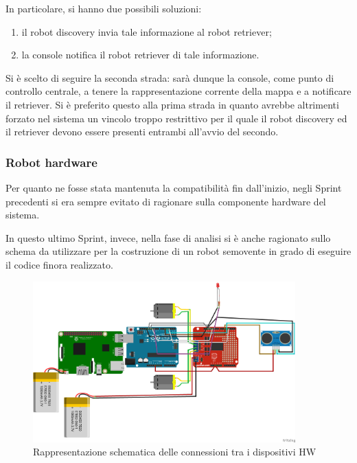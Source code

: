 In particolare, si hanno due possibili soluzioni:

\begin{enumerate}
  \item il robot discovery invia tale informazione al robot retriever;
  \item la console notifica il robot retriever di tale informazione.
\end{enumerate}

Si è scelto di seguire la seconda strada: sarà dunque la console, come punto di controllo centrale, a tenere la rappresentazione corrente della mappa e a notificare il retriever.
Si è preferito questo alla prima strada in quanto avrebbe altrimenti forzato nel sistema un vincolo troppo restrittivo per il quale il robot discovery ed il retriever devono essere presenti entrambi all'avvio del secondo.

\subsubsection{Robot hardware}

Per quanto ne fosse stata mantenuta la compatibilità fin dall'inizio, negli Sprint precedenti si era sempre evitato di ragionare sulla componente hardware del sistema.

In questo ultimo Sprint, invece, nella fase di analisi si è anche ragionato sullo schema da utilizzare per la costruzione di un robot semovente in grado di eseguire il codice finora realizzato.

\begin{figure}[H]
  \centering
  \includegraphics[width=0.9\textwidth]{res/sprint4/NanoBotArduino.png}%
  \caption{Rappresentazione schematica delle connessioni tra i dispositivi HW}%
  \label{fig:sp4:nanobot}
\end{figure}

